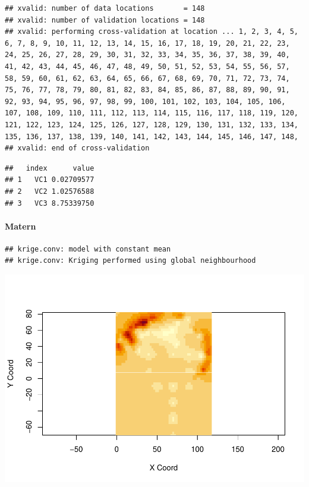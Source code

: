 \documentclass[
]{article}
\begin{document}
\begin{verbatim}
## xvalid: number of data locations       = 148
## xvalid: number of validation locations = 148
## xvalid: performing cross-validation at location ... 1, 2, 3, 4, 5, 6, 7, 8, 9, 10, 11, 12, 13, 14, 15, 16, 17, 18, 19, 20, 21, 22, 23, 24, 25, 26, 27, 28, 29, 30, 31, 32, 33, 34, 35, 36, 37, 38, 39, 40, 41, 42, 43, 44, 45, 46, 47, 48, 49, 50, 51, 52, 53, 54, 55, 56, 57, 58, 59, 60, 61, 62, 63, 64, 65, 66, 67, 68, 69, 70, 71, 72, 73, 74, 75, 76, 77, 78, 79, 80, 81, 82, 83, 84, 85, 86, 87, 88, 89, 90, 91, 92, 93, 94, 95, 96, 97, 98, 99, 100, 101, 102, 103, 104, 105, 106, 107, 108, 109, 110, 111, 112, 113, 114, 115, 116, 117, 118, 119, 120, 121, 122, 123, 124, 125, 126, 127, 128, 129, 130, 131, 132, 133, 134, 135, 136, 137, 138, 139, 140, 141, 142, 143, 144, 145, 146, 147, 148, 
## xvalid: end of cross-validation
\end{verbatim}

\begin{verbatim}
##   index      value
## 1   VC1 0.02709577
## 2   VC2 1.02576588
## 3   VC3 8.75339750
\end{verbatim}

\hypertarget{matern-1}{%
\paragraph{Matern}\label{matern-1}}

\begin{verbatim}
## krige.conv: model with constant mean
## krige.conv: Kriging performed using global neighbourhood
\end{verbatim}

\includegraphics{Assignment_1_files/figure-latex/unnamed-chunk-60-1.pdf}
\end{document}
